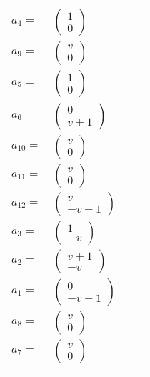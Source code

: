 \documentclass[1p]{elsarticle_modified}
\theoremstyle{definition}
\begin{document}
\begin{tabular}{m{7pt} m{180pt} m{7pt} m{180pt} }
\flushright $a_{4}=$&$\begin{pmatrix}1\\0\end{pmatrix}$ \\
\flushright $a_{9}=$&$\begin{pmatrix}v\\0\end{pmatrix}$ \\
\flushright $a_{5}=$&$\begin{pmatrix}1\\0\end{pmatrix}$ \\
\flushright $a_{6}=$&$\begin{pmatrix}0\\v+1\end{pmatrix}$ \\
\flushright $a_{10}=$&$\begin{pmatrix}v\\0\end{pmatrix}$ \\
\flushright $a_{11}=$&$\begin{pmatrix}v\\0\end{pmatrix}$ \\
\flushright $a_{12}=$&$\begin{pmatrix}v\\- v-1\end{pmatrix}$ \\
\flushright $a_{3}=$&$\begin{pmatrix}1\\- v\end{pmatrix}$ \\
\flushright $a_{2}=$&$\begin{pmatrix}v+1\\- v\end{pmatrix}$ \\
\flushright $a_{1}=$&$\begin{pmatrix}0\\- v-1\end{pmatrix}$ \\
\flushright $a_{8}=$&$\begin{pmatrix}v\\0\end{pmatrix}$ \\
\flushright $a_{7}=$&$\begin{pmatrix}v\\0\end{pmatrix}$\\&\end{tabular}
\end{document}
